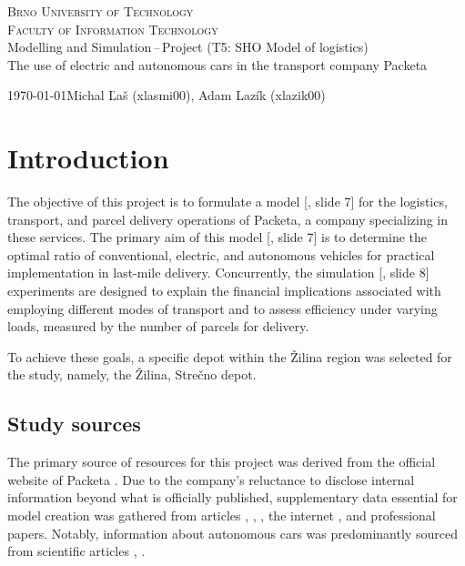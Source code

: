 \documentclass[a4paper, 11pt, a4paper]{article}
\begin{document}
\begin{titlepage}
    \begin{center}
            \textsc{\Huge Brno University of Technology \\}
            \vspace{0.5em}
            \textsc{\huge Faculty of Information Technology \\}
            {\LARGE 	Modelling and Simulation\,--\,Project (T5: SHO Model of logistics) \\
            \vspace{0.4em}
            \Huge The use of electric and autonomous cars in the transport company Packeta}
    \end{center}
    {\Large \today \hfill Michal Ľaš (xlasmi00), Adam Lazík (xlazik00)}
\end{titlepage}

\tableofcontents
\newpage

\section{Introduction}

The objective of this project is to formulate a model [\cite{IMS.lectures}, slide 7] for the logistics, transport, and parcel delivery operations of Packeta,
a company specializing in these services. The primary aim of this model [\cite{IMS.lectures}, slide 7] is to determine the optimal ratio of conventional, electric,
and autonomous vehicles for practical implementation in last-mile delivery. Concurrently, the simulation [\cite{IMS.lectures}, slide 8] experiments are designed to
explain the financial implications associated with employing different modes of transport and to assess efficiency under varying loads,
measured by the number of parcels for delivery.

To achieve these goals, a specific depot within the Žilina region was selected for the study, namely, the Žilina, Strečno depot.


\subsection{Study sources}

The primary source of resources for this project was derived from the official website of Packeta \cite{packeta}.
Due to the company's reluctance to disclose internal information beyond what is officially published,
supplementary data essential for model creation was gathered from articles \cite{delivery.distance}, \cite{delivery.percentage},
\cite{parcels.num}, the internet \cite{peugeot}, and professional papers.
Notably, information about autonomous cars was predominantly sourced from scientific articles \cite{autonomous.emissions}, \cite{autonomous.models}.
\end{document}
